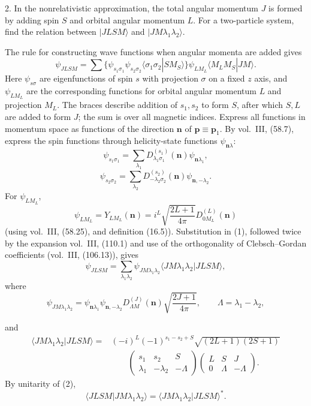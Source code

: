 2. In the nonrelativistic approximation, the total angular momentum $J$ is formed by adding spin $S$ and orbital angular momentum $L$. For a two-particle system, find the relation between $|JLSM\rangle$ and $|JM\lambda_1\lambda_2\rangle$.

\SolutionHeading The rule for constructing wave functions when angular momenta are added gives
\begin{equation}
\psi_{JLSM}=\sum
\{\psi_{s_1\sigma_1}\psi_{s_2\sigma_2}\langle\sigma_1\sigma_2|SM_S\rangle\}
\psi_{LM_L}\langle M_LM_S|JM\rangle.
\tag{1}
\end{equation}
Here $\psi_{s\sigma}$ are eigenfunctions of spin $s$ with projection $\sigma$ on a fixed $z$ axis, and $\psi_{LM_L}$ are the corresponding functions for orbital angular momentum $L$ and projection $M_L$. The braces describe addition of $s_1,s_2$ to form $S$, after which $S,L$ are added to form $J$; the sum is over all magnetic indices. Express all functions in momentum space as functions of the direction $\mathbf n$ of $\mathbf p\equiv\mathbf p_1$. By vol.~III, (58.7), express the spin functions through helicity-state functions $\psi_{\mathbf n\lambda}$:
\[
\psi_{s_1\sigma_1}=\sum_{\lambda_1}D_{\lambda_1\sigma_1}^{(s_1)}(\mathbf n)\psi_{\mathbf n\lambda_1},
\]
\[
\psi_{s_2\sigma_2}=\sum_{\lambda_2}D_{-\lambda_2\sigma_2}^{(s_2)}(\mathbf n)\psi_{\mathbf n,-\lambda_2}.
\]
For $\psi_{LM_L}$,
\[
\psi_{LM_L}=Y_{LM_L}(\mathbf n)
=i^L\sqrt{\frac{2L+1}{4\pi}}D_{0M_L}^{(L)}(\mathbf n)
\]
(using vol.~III, (58.25), and definition (16.5)). Substitution in (1), followed twice by the expansion vol.~III, (110.1) and use of the orthogonality of Clebsch--Gordan coefficients (vol.~III, (106.13)), gives
\begin{equation}
\psi_{JLSM}=\sum_{\lambda_1\lambda_2}
\psi_{JM\lambda_1\lambda_2}\langle JM\lambda_1\lambda_2|JLSM\rangle,
\tag{2}
\end{equation}
where
\[
\psi_{JM\lambda_1\lambda_2}
=\psi_{\mathbf n\lambda_1}\psi_{\mathbf n,-\lambda_2}
D_{\Lambda M}^{(J)}(\mathbf n)\sqrt{\frac{2J+1}{4\pi}},
\qquad \Lambda=\lambda_1-\lambda_2,
\]

and
\begin{equation}
\begin{aligned}
\langle JM\lambda_1\lambda_2|JLSM\rangle
={}&(-i)^L(-1)^{s_1-s_2+S}\sqrt{(2L+1)(2S+1)}\\
&{}\qquad
\begin{pmatrix}s_1&s_2&S\\ \lambda_1&-\lambda_2&-\Lambda\end{pmatrix}
\begin{pmatrix}L&S&J\\ 0&\Lambda&-\Lambda\end{pmatrix}.
\end{aligned}
\tag{3}
\end{equation}
By unitarity of (2),
\[
\langle JLSM|JM\lambda_1\lambda_2\rangle
=\langle JM\lambda_1\lambda_2|JLSM\rangle^*.
\]
